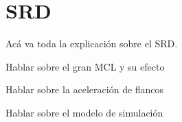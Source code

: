 \chapter{SRD}

Acá va toda la explicación sobre el SRD.

Hablar sobre el gran MCL y su efecto

Hablar sobre la aceleración de flancos

Hablar sobre el modelo de simulación
